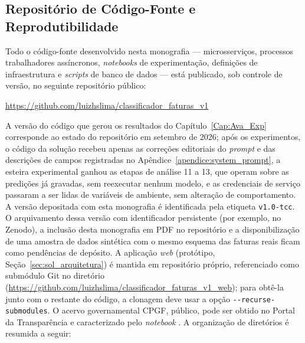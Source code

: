 \begin{apendicesenv}
\chapter{Repositório de Código-Fonte e Reprodutibilidade}
\label{apendice:repositorio}

Todo o código-fonte desenvolvido nesta monografia --- microsserviços, processos trabalhadores assíncronos, \textit{notebooks} de experimentação, definições de infraestrutura e \textit{scripts} de banco de dados --- está publicado, sob controle de versão, no seguinte repositório público:

\begin{center}
	\url{https://github.com/luizhslima/classificador_faturas_v1}
\end{center}

A versão do código que gerou os resultados do Capítulo~\ref{Cap:Ava_Exp} corresponde ao estado do repositório em setembro de 2026; após os experimentos, o código da solução recebeu apenas as correções editoriais do \textit{prompt} e das descrições de campos registradas no Apêndice~\ref{apendice:system_prompt}, a esteira experimental ganhou as etapas de análise 11 a 13, que operam sobre as predições já gravadas, sem reexecutar nenhum modelo, e as credenciais de serviço passaram a ser lidas de variáveis de ambiente, sem alteração de comportamento. A versão depositada com esta monografia é identificada pela etiqueta \texttt{v1.0-tcc}. O arquivamento dessa versão com identificador persistente (por exemplo, no Zenodo), a inclusão desta monografia em PDF no repositório e a disponibilização de uma amostra de dados sintética com o mesmo esquema das faturas reais ficam como pendências de depósito. A aplicação \textit{web} (protótipo, Seção~\ref{sec:sol_arquitetura}) é mantida em repositório próprio, referenciado como submódulo Git no diretório  (\url{https://github.com/luizhslima/classificador_faturas_v1_web}); para obtê-la junto com o restante do código, a clonagem deve usar a opção \texttt{-{}-recurse-submodules}. O acervo governamental CPGF, público, pode ser obtido no Portal da Transparência \cite{brasilcpgf} e caracterizado pelo \textit{notebook} . A organização de diretórios é resumida a seguir:


\end{apendicesenv}
